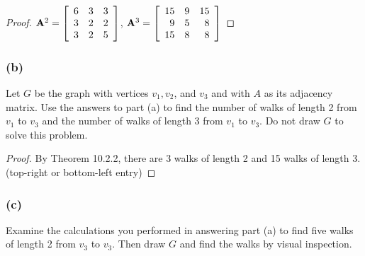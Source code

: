 \documentclass[14pt]{extarticle}
\begin{document}
\begin{proof}
    \({\bf A}^2 =
    \left[
        \begin{array}{rrr}
            6 & 3 & 3 \\
            3 & 2 & 2 \\
            3 & 2 & 5 \\
        \end{array}
        \right]
    \),
    \({\bf A}^3 =
    \left[
        \begin{array}{rrr}
            15 & 9 & 15 \\
            9  & 5 & 8  \\
            15 & 8 & 8  \\
        \end{array}
        \right]
    \)
\end{proof}

\subsubsection{(b)}
Let \(G\) be the graph with vertices \(v_1, v_2\), and \(v_3\) and with \(A\) as its adjacency matrix. Use the answers to
part (a) to find the number of walks of length 2 from \(v_1\) to \(v_3\) and the number of walks of length 3 from \(v_1\) to
\(v_3\). Do not draw \(G\) to solve this problem.

\begin{proof}
    By Theorem 10.2.2, there are 3 walks of length 2 and 15 walks of length 3. (top-right or bottom-left entry)
\end{proof}

\subsubsection{(c)}
Examine the calculations you performed in answering part (a) to find five walks of length 2 from \(v_3\) to \(v_3\). Then
draw \(G\) and find the walks by visual inspection.
\end{document}
